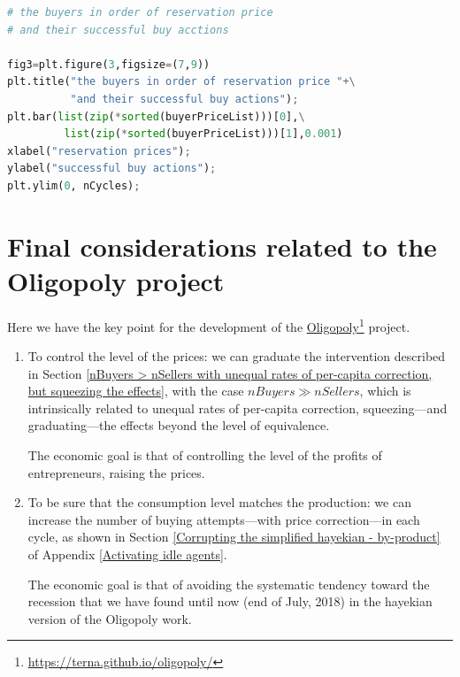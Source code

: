 \documentclass[10pt]{report}
\begin{document}
\begin{appendices}
\begin{lstlisting}[language=Python, caption=The code to show agents' successful actions in the by-product case, label={The code to show agents' successful actions in the by product case},
basicstyle=\ttfamily\footnotesize]
# the buyers in order of reservation price 
# and their successful buy acctions

fig3=plt.figure(3,figsize=(7,9))
plt.title("the buyers in order of reservation price "+\
          "and their successful buy actions");
plt.bar(list(zip(*sorted(buyerPriceList)))[0],\
         list(zip(*sorted(buyerPriceList)))[1],0.001)
xlabel("reservation prices");
ylabel("successful buy actions");
plt.ylim(0, nCycles);
\end{lstlisting}


\section{Final considerations related to the Oligopoly project}

Here we have the key point for the development of the \href{https://terna.github.io/oligopoly/}{Oligopoly}\footnote{\url{https://terna.github.io/oligopoly/}} project.

\begin{enumerate}[label=\Roman*]

\item To control the level of the prices: we can graduate the intervention described in Section \ref{nBuyers > nSellers with unequal rates of per-capita correction, but squeezing the effects}, with the case $nBuyers \gg nSellers$, which is intrinsically related to unequal rates of per-capita correction, squeezing---and graduating---the effects beyond the level of equivalence.

The economic goal is that of controlling the level of the profits of entrepreneurs, raising the prices.

\item To be sure that the consumption level matches the production: we can increase the number of buying attempts---with price correction---in each cycle, as shown in Section \ref{Corrupting the simplified hayekian - by-product} of Appendix \ref{Activating idle agents}.

The economic goal is that of avoiding the systematic tendency toward the recession that we have found until now (end of July, 2018) in the hayekian version of the Oligopoly work.

\end{enumerate}

\end{appendices}

\clearpage
{}




\clearpage
{}
\printindex
\end{document}
